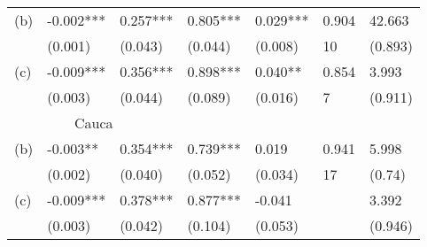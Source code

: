 \begin{table}[H]
\begin{tabular}{lllllll}
\vspace{-0.3cm} (b) & -0.002*** & 0.257*** & 0.805*** & 0.029*** & 0.904 & 42.663\\   
& \scriptsize{(0.001)} & \scriptsize{(0.043)} & \scriptsize{(0.044)} & \scriptsize{(0.008)} & \scriptsize{10}    & \scriptsize{(0.893)} \\
\vspace{-0.3cm} (c) & -0.009*** & 0.356*** & 0.898*** & 0.040** & 0.854 & 3.993\\   
& \scriptsize{(0.003)} & \scriptsize{(0.044)} & \scriptsize{(0.089)} & \scriptsize{(0.016)} & \scriptsize{7}    & \scriptsize{(0.911)} \\
\hline \multicolumn{3}{c}{Cauca} &       &       &       &  \\
\vspace{-0.3cm} (b) & -0.003** & 0.354*** & 0.739*** & 0.019 & 0.941 & 5.998\\   
& \scriptsize{(0.002)} & \scriptsize{(0.040)} & \scriptsize{(0.052)} & \scriptsize{(0.034)} & \scriptsize{17}    & \scriptsize{(0.74)} \\
\vspace{-0.3cm} (c) & -0.009*** & 0.378*** & 0.877*** & -0.041 &       & 3.392\\   
& \scriptsize{(0.003)} & \scriptsize{(0.042)} & \scriptsize{(0.104)} & \scriptsize{(0.053)} &       & \scriptsize{(0.946)} \\
\hline 
\end{tabular}%
\label{tab:addlabel}%
\end{table}%



